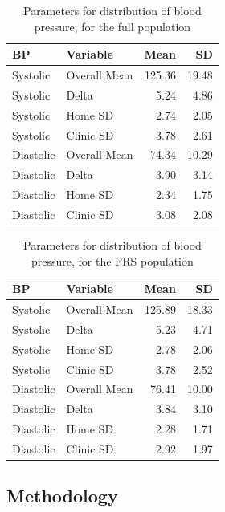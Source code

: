 \documentclass[
]{article}
\begin{document}
\begin{table}

\caption{\label{tab:BloodFull}Parameters for distribution of blood pressure, for the full population}
\centering
\begin{tabular}[t]{llrr}
\toprule
BP & Variable & Mean & SD\\
\midrule
Systolic & Overall Mean & 125.36 & 19.48\\
Systolic & Delta & 5.24 & 4.86\\
Systolic & Home SD & 2.74 & 2.05\\
Systolic & Clinic SD & 3.78 & 2.61\\
Diastolic & Overall Mean & 74.34 & 10.29\\
\addlinespace
Diastolic & Delta & 3.90 & 3.14\\
Diastolic & Home SD & 2.34 & 1.75\\
Diastolic & Clinic SD & 3.08 & 2.08\\
\bottomrule
\end{tabular}
\end{table}

\begin{table}

\caption{\label{tab:BloodFRS}Parameters for distribution of blood pressure, for the FRS population}
\centering
\begin{tabular}[t]{llrr}
\toprule
BP & Variable & Mean & SD\\
\midrule
Systolic & Overall Mean & 125.89 & 18.33\\
Systolic & Delta & 5.23 & 4.71\\
Systolic & Home SD & 2.78 & 2.06\\
Systolic & Clinic SD & 3.78 & 2.52\\
Diastolic & Overall Mean & 76.41 & 10.00\\
\addlinespace
Diastolic & Delta & 3.84 & 3.10\\
Diastolic & Home SD & 2.28 & 1.71\\
Diastolic & Clinic SD & 2.92 & 1.97\\
\bottomrule
\end{tabular}
\end{table}

\hypertarget{methodology}{%
\subsection{Methodology}\label{methodology}}
\end{document}
